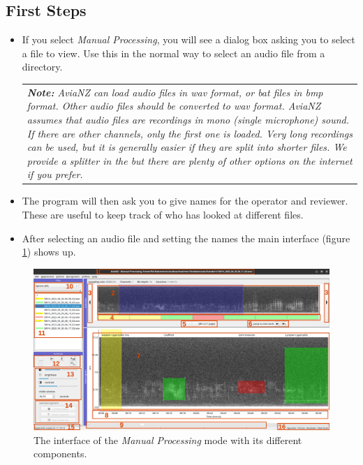 \documentclass{scrartcl}
\begin{document}
\subsection{First Steps}
\begin{itemize}
	\item If you select \textit{Manual Processing}, you will see a dialog box asking you to select a file to view. Use this in the normal way to select an audio file from a directory.
	\begin{table}[h!]
		\centering
		\begin{tabular}{p{}}
	\textit{\textbf{Note:} AviaNZ can load audio files in wav format, or bat files in bmp format. Other audio files should be converted to wav format.
	AviaNZ assumes that audio files are recordings in mono (single microphone) sound. If there are other channels, only the first one is loaded.
	Very long recordings can be used, but it is generally easier if they are split into shorter files. We provide a splitter in the \nameref{sec:utilities} but there are plenty of other options on the internet if you prefer.}\\
		\end{tabular}
	\end{table}
	\item The program will then ask you to give names for the operator and reviewer. These are useful to keep track of who has looked at different files.
	\item After selecting an audio file and setting the names the main interface (figure \ref{fig:Interface}) shows up.
\end{itemize}



\begin{figure}[htpb]
	\centering
	\includegraphics[width=.95\textwidth]{Figures/AviaNZInterface.pdf}
\caption{The interface of the \textit{Manual Processing} mode with its different components.}
	\label{fig:Interface}
\end{figure}
\end{document}
